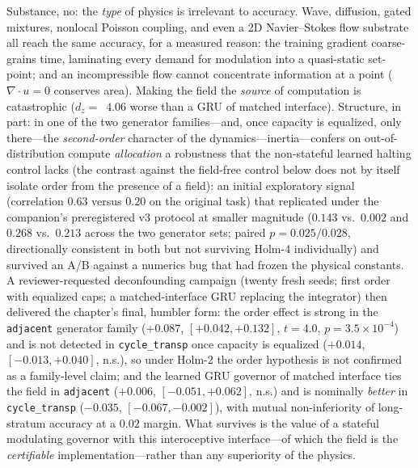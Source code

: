 \documentclass{article}
\newcommand{\FdosDz}{$4.06$}
\newcommand{\VtresCorr}{$0.63$} \newcommand{\VtresCorrBase}{$0.20$}
\begin{document}
Substance, no: the \emph{type} of physics is irrelevant to accuracy. Wave,
diffusion, gated mixtures, nonlocal Poisson coupling, and even a 2D
Navier--Stokes flow substrate all reach the same accuracy, for a measured
reason: the training gradient coarse-grains time, laminating every demand for
modulation into a quasi-static set-point; and an incompressible flow cannot
concentrate information at a point ($\nabla\!\cdot u=0$ conserves area).
Making the field the \emph{source} of computation is catastrophic
($d_z=$~\FdosDz{} worse than a GRU of matched interface). Structure, in part:
in one of the two generator families---and, once capacity is equalized, only
there---the \emph{second-order} character of the dynamics---inertia---confers
on out-of-distribution compute \emph{allocation} a robustness that the
non-stateful learned halting control lacks (the contrast against the
field-free control below does not by itself isolate order from the presence of
a field): an initial exploratory signal (correlation \VtresCorr{}
versus \VtresCorrBase{} on the original task) that replicated under the
companion's preregistered v3 protocol at smaller magnitude ($0.143$ vs.\
$0.002$ and $0.268$ vs.\ $0.213$ across the two generator sets; paired
$p{=}0.025/0.028$, directionally consistent in both but not surviving Holm-4
individually) and survived an A/B against a numerics bug that had frozen the
physical constants. A reviewer-requested deconfounding campaign (twenty
fresh seeds; first order with equalized caps; a matched-interface GRU
replacing the integrator) then delivered the chapter's final, humbler
form: the order effect is strong in the \texttt{adjacent} generator family
($+0.087$, $[+0.042,+0.132]$, $t{=}4.0$, $p{=}3.5{\times}10^{-4}$) and is not
detected in \texttt{cycle\_transp} once capacity is equalized ($+0.014$,
$[-0.013,+0.040]$, n.s.), so under Holm-2 the order hypothesis is not
confirmed as a family-level claim; and the learned GRU governor of matched
interface ties the field in \texttt{adjacent} ($+0.006$, $[-0.051,+0.062]$,
n.s.) and is nominally \emph{better} in \texttt{cycle\_transp} ($-0.035$,
$[-0.067,-0.002]$), with mutual non-inferiority of long-stratum accuracy at a
$0.02$ margin. What survives is the
value of a stateful modulating governor with this interoceptive
interface---of which the field is the \emph{certifiable}
implementation---rather than any superiority of the physics.
\end{document}
